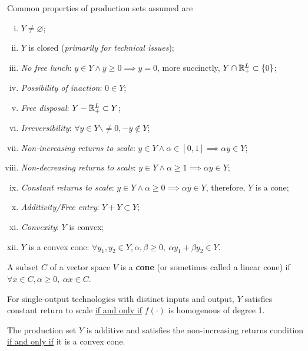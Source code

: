 \documentclass{article}
\begin{document}
	 		\begin{assumption}
	 			Common properties of production sets assumed are
	 			\begin{enumerate}[(i)]
	 				\item $Y \neq \varnothing$;
	 				\item $Y$ is closed (\emph{primarily for technical issues});
	 				\item \emph{No free lunch}: $y \in Y \land y \geq 0 \implies y = 0$, more succinctly, $Y \cap \mathbb{R}^L_+ \subset \{0\}$;
	 				\item \emph{Possibility of inaction}: $0 \in Y$;
	 				\item \emph{Free disposal}: $Y - \mathbb{R}^L_+ \subset Y$;
	 				\item \emph{Irreversibility}: $\forall y \in Y \backslash \neq 0, -y \notin Y$;
	 				\item \emph{Non-increasing returns to scale}: $y \in Y \land \alpha \in [0, 1] \implies  \alpha y \in Y$;
	 				\item \emph{Non-decreasing returns to scale}: $y \in Y \land \alpha \geq 1 \implies \alpha y \in Y$;
	 				\item \emph{Constant returns to scale}: $y \in Y \land \alpha \geq 0 \implies \alpha y \in Y$, therefore, $Y$ is a cone;
	 				\item \emph{Additivity/Free entry}: $Y + Y \subset Y$;
	 				\item \emph{Convexity}: $Y$ is convex;
	 				\item $Y$ is a convex cone: $\forall y_1, y_2 \in Y, \alpha, \beta \geq 0,\ \alpha y_1 + \beta y_2 \in Y$.
	 			\end{enumerate}
	 		\end{assumption}
	 		
	 		\begin{definition}
	 			A subset $C$ of a vector space $V$ is a \textbf{cone} (or sometimes called a linear cone) if $\forall x \in C, \alpha \geq 0,\ \alpha x \in C$.
	 		\end{definition}
	 		
	 		\begin{proposition}[Exercise 5.B.2]
	 			For single-output technologies with distinct inputs and output, $Y$ satisfies constant return to scale \ul{if and only if} $f(\cdot)$ is homogenous of degree 1.
	 		\end{proposition}
	 		
	 		\begin{proposition}[5.B.1]
	 			The production set $Y$ is additive and satisfies the non-increasing returns condition \ul{if and only if} it is a convex cone.
	 		\end{proposition}
	 		
\end{document}
